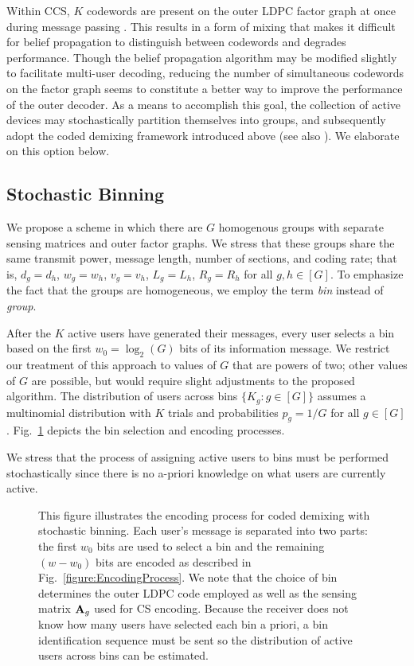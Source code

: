 \documentclass[journal]{IEEEtran}
\begin{document}
Within CCS, $K$ codewords are present on the outer LDPC factor graph at once during message passing \cite{amalladinne2020unsourced}. 
This results in a form of mixing that makes it difficult for belief propagation to distinguish between codewords and degrades performance.
Though the belief propagation algorithm may be modified slightly to facilitate multi-user decoding, reducing the number of simultaneous codewords on the factor graph seems to constitute a better way to improve the performance of the outer decoder. 
As a means to accomplish this goal, the collection of active devices may stochastically partition themselves into groups, and subsequently adopt the coded demixing framework introduced above (see also \cite{ebert2021stochastic}). 
We elaborate on this option below.


\subsection{Stochastic Binning}

We propose a scheme in which there are $G$ homogenous groups with separate sensing matrices and outer factor graphs. 
We stress that these groups share the same transmit power, message length, number of sections, and coding rate; that is, $d_g = d_h$, $w_g = w_h$, $v_g = v_h$, $L_g = L_h$, $R_g = R_h$ for all $g, h \in [G]$. 
To emphasize the fact that the groups are homogeneous, we employ the term \emph{bin} instead of \emph{group}. 

After the $K$ active users have generated their messages, every user selects a bin based on the first $w_0 = \log_2(G)$ bits of its information message.
We restrict our treatment of this approach to values of $G$ that are powers of two;
other values of $G$ are possible, but would require slight adjustments to the proposed algorithm.
The distribution of users across bins $\{K_g : g \in [G]\}$ assumes a multinomial distribution with $K$ trials and probabilities $p_g = 1/G$ for all $g \in [G]$. %
Fig.~\ref{fig:StochasticBinningEncoding} depicts the bin selection and encoding processes.

We stress that the process of assigning active users to bins must be performed stochastically since
there is no a-priori  knowledge on what users are currently active. 

\begin{figure}[ht!]
    \centering
    
    \caption{
        This figure illustrates the encoding process for coded demixing with stochastic binning. 
        Each user's message is separated into two parts: the first $w_0$ bits are used to select a bin and the remaining $\left(w - w_0\right)$ bits are encoded as described in Fig.~\ref{figure:EncodingProcess}.
        We note that the choice of bin determines the outer LDPC code employed as well as the sensing matrix $\mathbf{A}_g$ used for CS encoding.
        Because the receiver does not know how many users have selected each bin a priori, a bin identification sequence must be sent so the distribution of active users across bins can be estimated. 
    }
    \label{fig:StochasticBinningEncoding}
\end{figure}
\end{document}
